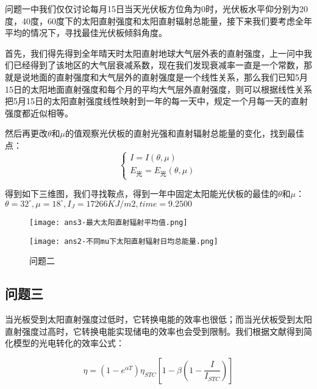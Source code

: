 \documentclass[withoutpreface,bwprint]{cumcmthesis} %
\begin{document}
问题一中我们仅仅讨论每月15日当天光伏板方位角为0时，光伏板水平仰分别为20度，40度，60度下的太阳直射强度和太阳直射辐射总能量，接下来我们要考虑全年平均的情况下，寻找最佳光伏板倾斜角度。

首先，我们得先得到全年晴天时太阳直射地球大气层外表的直射强度，上一问中我们已经得到了该地区的大气层衰减系数，现在我们发现衰减率一直是一个常数，那就是说地面的直射强度和大气层外的直射强度是一个线性关系，那么我们已知5月15日的太阳地面直射强度和每个月的平均大气层外直射强度，则可以根据线性关系把5月15日的太阳直射强度线性映射到一年的每一天中，规定一个月每一天的直射强度都近似相等。

然后再更改$\theta$和$\mu$的值观察光伏板的直射光强和直射辐射总能量的变化，找到最佳点：
\begin{equation}
	\begin{cases}
		I = I(\theta,\mu) \\
		E_{\mbox{光}} = E_{\mbox{光}}(\theta, \mu)
	\end{cases}
	\label{eq:003}
\end{equation}

得到如下三维图，我们寻找鞍点，得到一年中固定太阳能光伏板的最佳的$\theta$和$\mu$：$\theta = 32^{\circ},\mu = 18^{\circ},I_J = 17266 KJ/m2,time = 9.2500$

\begin{figure}
	\centering
	\begin{minipage}[c]{0.48\textwidth}
		\centering
		\texttt{[image: ans3-最大太阳直射辐射平均值.png]}
	\end{minipage}
	\begin{minipage}[c]{0.48\textwidth}
		\centering
		\texttt{[image: ans2-不同mu下太阳直射辐射日均总能量.png]}
	\end{minipage}
	\caption{问题二}
\end{figure}
\newpage



\subsection{问题三}

当光板受到太阳直射强度过低时，它转换电能的效率也很低；而当光伏板受到太阳直射强度过高时，它转换电能实现储电的效率也会受到限制。我们根据文献得到简化模型的光电转化的效率公式：

\begin{equation}
	\eta = (1-e^{\alpha T})\eta_{STC}\left[ 1-\beta\left( 1-\frac{I}{I_{STC}} \right) \right]
	\label{eq:013}
\end{equation}
\end{document}
